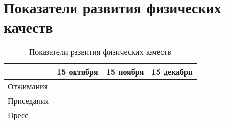 \documentclass[a4paper,12pt]{report}
\begin{document}
\section*{Показатели развития физических качеств}
\begin{table}[!h]
    \begin{tabular}{|l|l|l|l|}
        \hline
        \textbf{}  & \textbf{15 октября} & \textbf{15 ноября} & \textbf{15 декабря} \\ \hline
        Отжимания  & & & \\ \hline
        Приседания & & & \\ \hline
        Пресс      & & & \\ \hline
    \end{tabular}                    
    \caption{Показатели развития физических качеств}
\end{table}
\end{document}

